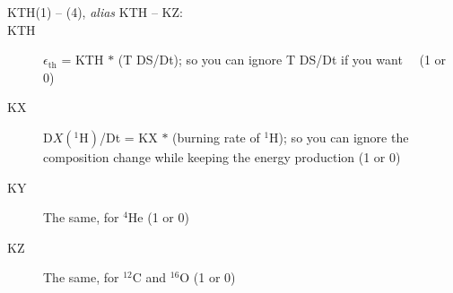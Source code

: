 \begin{description}
\item[KTH(1) -- (4), \emph{alias} KTH -- KZ:]
\item[KTH]\hypertarget{kth}{} $\epsilon_\mathrm{th}$ = KTH $*$ (T DS/Dt); so you can ignore T DS/Dt if you want \ \ (1 or 0) 
\item[KX]\hypertarget{kx}{} D$X(^1\mathrm{H})$/Dt = KX $*$ (burning rate of $^1\mathrm{H}$); so you can ignore the composition change while keeping the energy production (1 or 0)
\item[KY]\hypertarget{ky}{} The same, for $^4$He (1 or 0)
\item[KZ]\hypertarget{kz}{} The same, for $^{12}$C and $^{16}$O (1 or 0)
\end{description}

